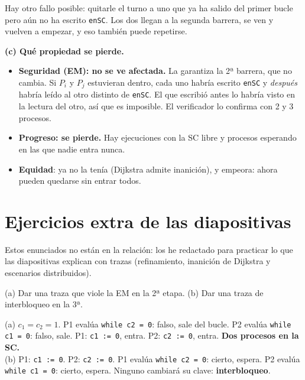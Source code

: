 \documentclass[11pt,a4paper,oneside]{report}
\begin{document}
\begin{solucion}
Hay otro fallo posible: quitarle el turno a uno que ya ha salido del primer bucle pero aún no ha escrito
\texttt{enSC}. Los dos llegan a la segunda barrera, se ven y vuelven a empezar, y eso también puede repetirse.

\textbf{(c) Qué propiedad se pierde.}
\begin{itemize}[leftmargin=*]
  \item \textbf{Seguridad (EM): no se ve afectada.} La garantiza la 2ª barrera, que no cambia. Si $P_i$ y $P_j$
        estuvieran dentro, cada uno habría escrito \texttt{enSC} y \emph{después} habría leído al otro distinto de
        \texttt{enSC}. El que escribió antes lo habría visto en la lectura del otro, así que es imposible. El
        verificador lo confirma con 2 y 3 procesos.
  \item \textbf{Progreso: se pierde.} Hay ejecuciones con la SC libre y procesos esperando en las que nadie entra
        nunca.
  \item \textbf{Equidad}: ya no la tenía (Dijkstra admite inanición), y empeora: ahora pueden quedarse sin entrar
        todos.
\end{itemize}
\end{solucion}

\section{Ejercicios extra de las diapositivas}
Estos enunciados no están en la relación: los he redactado para practicar lo que las diapositivas explican con
trazas (refinamiento, inanición de Dijkstra y escenarios distribuidos).

\begin{ejercicio}
(a) Dar una traza que viole la EM en la 2ª etapa. (b) Dar una traza de interbloqueo en la 3ª.
\end{ejercicio}
\begin{solucion}
(a) $c_1 = c_2 = 1$. P1 evalúa \texttt{while c2 = 0}: falso, sale del bucle. P2 evalúa \texttt{while c1 = 0}:
falso, sale. P1: \texttt{c1 := 0}, entra. P2: \texttt{c2 := 0}, entra. \textbf{Dos procesos en la SC.}\\[3pt]
(b) P1: \texttt{c1 := 0}. P2: \texttt{c2 := 0}. P1 evalúa \texttt{while c2 = 0}: cierto, espera. P2 evalúa
\texttt{while c1 = 0}: cierto, espera. Ninguno cambiará su clave: \textbf{interbloqueo}.
\end{solucion}
\end{document}
